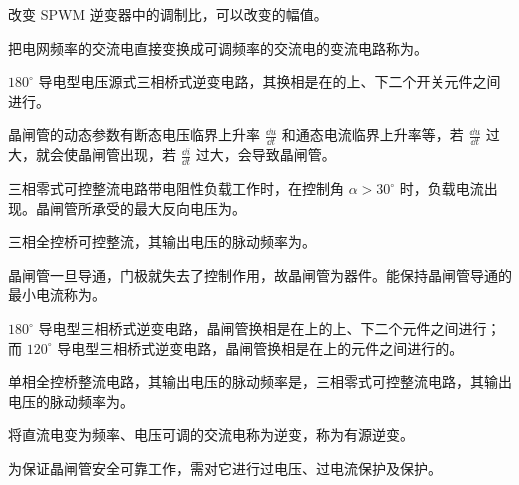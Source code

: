 \documentclass[电力电子]{subfiles}
\begin{document}
\begin{ti}
	改变 SPWM 逆变器中的调制比，可以改变的幅值。
\end{ti}

\begin{ti}
	把电网频率的交流电直接变换成可调频率的交流电的变流电路称为。
\end{ti}

\begin{ti}
	$180^\circ$ 导电型电压源式三相桥式逆变电路，其换相是在的上、下二个开关元件之间进行。
\end{ti}

\begin{ti}
	晶闸管的动态参数有断态电压临界上升率 $\frac{\dd{u}}{\dd{t}}$ 和通态电流临界上升率等，若 $\frac{\dd{u}}{\dd{t}}$ 过大，就会使晶闸管出现，若 $\frac{\dd{i}}{\dd{t}}$ 过大，会导致晶闸管。
\end{ti}

\begin{ti}
	三相零式可控整流电路带电阻性负载工作时，在控制角 $\alpha > 30^\circ$ 时，负载电流出现。晶闸管所承受的最大反向电压为。
\end{ti}

\begin{ti}
	三相全控桥可控整流，其输出电压的脉动频率为。
\end{ti}

\begin{ti}
	晶闸管一旦导通，门极就失去了控制作用，故晶闸管为器件。能保持晶闸管导通的最小电流称为。
\end{ti}

\begin{ti}
	$180^\circ$ 导电型三相桥式逆变电路，晶闸管换相是在上的上、下二个元件之间进行；而 $120^\circ$ 导电型三相桥式逆变电路，晶闸管换相是在上的元件之间进行的。
\end{ti}

\begin{ti}
	单相全控桥整流电路，其输出电压的脉动频率是，三相零式可控整流电路，其输出电压的脉动频率为。
\end{ti}

\begin{ti}
	将直流电变为频率、电压可调的交流电称为逆变，称为有源逆变。
\end{ti}

\begin{ti}
	为保证晶闸管安全可靠工作，需对它进行过电压、过电流保护及保护。
\end{ti}
\end{document}
